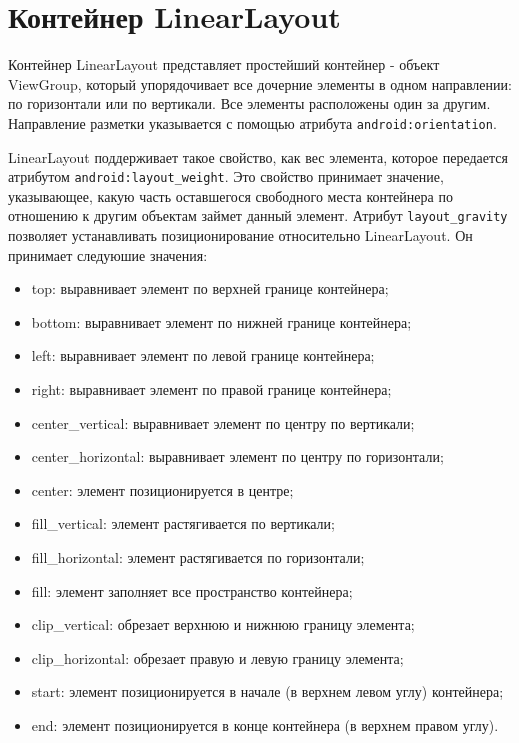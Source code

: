 \section{Контейнер LinearLayout}
Контейнер LinearLayout представляет простейший контейнер - объект 
ViewGroup, который упорядочивает все дочерние элементы в одном 
направлении: по горизонтали или по вертикали. Все элементы расположены 
один за другим. Направление разметки указывается с помощью атрибута 
\texttt{android:orientation}.\par
LinearLayout поддерживает такое свойство, как вес элемента, которое 
передается атрибутом \texttt{android:layout\_weight}. Это свойство принимает 
значение, указывающее, какую часть оставшегося свободного места 
контейнера по отношению к другим объектам займет данный элемент.
Атрибут \texttt{layout\_gravity} позволяет устанавливать позиционирование 
относительно LinearLayout. Он принимает следуюшие значения:

\begin{itemize}
	\item top: выравнивает элемент по верхней границе контейнера;
	\item bottom: выравнивает элемент по нижней границе контейнера;
	\item left: выравнивает элемент по левой границе контейнера;
	\item right: выравнивает элемент по правой границе контейнера;
	\item center\_vertical: выравнивает элемент по центру по вертикали;
	\item center\_horizontal: выравнивает элемент по центру по горизонтали;
	\item center: элемент позиционируется в центре;
	\item fill\_vertical: элемент растягивается по вертикали;
	\item fill\_horizontal: элемент растягивается по горизонтали;
	\item fill: элемент заполняет все пространство контейнера;
	\item clip\_vertical: обрезает верхнюю и нижнюю границу элемента;
	\item clip\_horizontal: обрезает правую и левую границу элемента;
	\item start: элемент позиционируется в начале (в верхнем левом углу) 
		контейнера;
	\item end: элемент позиционируется в конце контейнера (в верхнем 
		правом углу).
\end{itemize}

